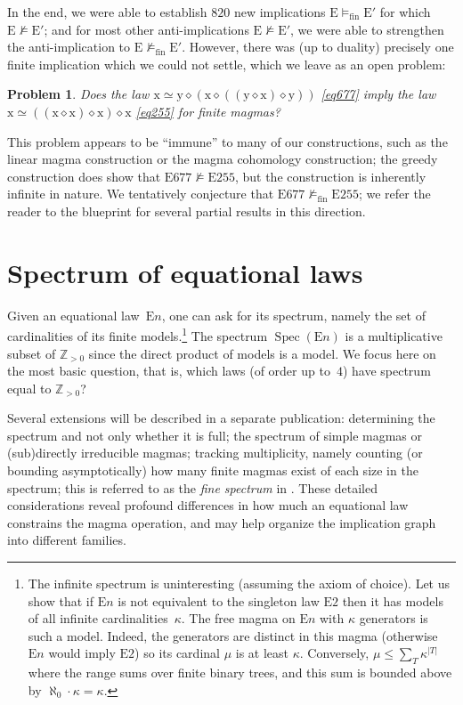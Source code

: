\documentclass[12pt]{amsart}
\newtheorem{problem}[theorem]{Problem}
\theoremstyle{definition}
\newcommand{\x}{\mathrm{x}}
\newcommand{\y}{\mathrm{y}}
\newcommand{\op}{\diamond}
\newcommand{\formaleq}{\simeq}
\newcommand{\modelsfin}{\models_{\mathrm{fin}}}
\newcommand{\Eq}[1]{\mathrm{E}#1}
\newcommand{\E}{\mathrm{E}}
\begin{document}
In the end, we were able to establish $820$ new implications $\E \modelsfin \E'$ for which $\E \not \models \E'$; and for most other anti-implications $\E \not \models \E'$, we were able to strengthen the anti-implication to $\E \not \modelsfin \E'$.  However, there was (up to duality) precisely one finite implication which we could not settle, which we leave as an open problem:

\begin{problem}  Does the law $\x \formaleq \y \op (\x \op ((\y \op \x) \op \y))$ \eqref{eq677} imply the law $\x \formaleq ((\x \op \x) \op \x) \op \x$ \eqref{eq255} for finite magmas?
\end{problem}

This problem appears to be ``immune'' to many of our constructions, such as the linear magma construction or the magma cohomology construction; the greedy construction does show that $\Eq{677} \not \models \Eq{255}$, but the construction is inherently infinite in nature.  We tentatively conjecture that $\Eq{677} \not \modelsfin \Eq{255}$; we refer the reader to the blueprint for several partial results in this direction.

\section{Spectrum of equational laws}\label{spectrum-sec}

Given an equational law~$\Eq{n}$, one can ask for its spectrum, namely the set of cardinalities of its finite models.\footnote{The infinite spectrum is uninteresting (assuming the axiom of choice).  Let us show that if $\Eq{n}$ is not equivalent to the singleton law $\Eq{2}$ then it has models of all infinite cardinalities~$\kappa$.  The free magma on $\Eq{n}$ with $\kappa$ generators is such a model.  Indeed, the generators are distinct in this magma (otherwise $\Eq{n}$ would imply $\Eq{2}$) so its cardinal $\mu$ is at least $\kappa$.  Conversely, $\mu\leq\sum_T\kappa^{|T|}$ where the range sums over finite binary trees, and this sum is bounded above by $\aleph_0\cdot\kappa=\kappa$.}
The spectrum $\operatorname{Spec}(\Eq{n})$ is a multiplicative subset of $\mathbb{Z}_{>0}$ since the direct product of models is a model.
We focus here on the most basic question, that is, which laws (of order up to~$4$) have spectrum equal to $\mathbb{Z}_{>0}$?

Several extensions will be described in a separate publication: determining the spectrum and not only whether it is full; the spectrum of simple magmas or (sub)directly irreducible magmas; tracking multiplicity, namely counting (or bounding asymptotically) how many finite magmas exist of each size in the spectrum; this is referred to as the \emph{fine spectrum} in \cite{taylor}.  These detailed considerations reveal profound differences in how much an equational law constrains the magma operation, and may help organize the implication graph into different families.
\end{document}
